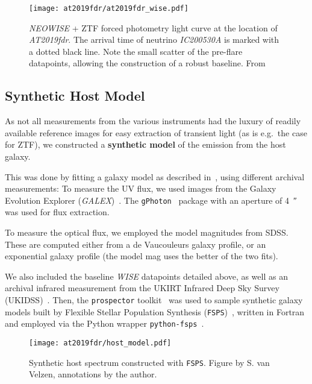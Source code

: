 \begin{figure}[htb]
    \texttt{[image: at2019fdr/at2019fdr\_wise.pdf]}
    \caption[\textit{NEOWISE} forced photometry]{\textit{NEOWISE} + ZTF forced photometry light curve at the location of \emph{AT2019fdr}. The arrival time of neutrino \emph{IC200530A} is marked with a dotted black line. Note the small scatter of the pre-flare datapoints, allowing the construction of a robust baseline. From~\cite{Velzen2021}}
\end{figure}

\subsection{Synthetic Host Model}\label{synthetic_host_model}
As not all measurements from the various instruments had the luxury of readily available reference images for easy extraction of transient light (as is e.g.\ the case for ZTF), we constructed a \textbf{synthetic model} of the emission from the host galaxy.

This was done by fitting a galaxy model as described in~, using different archival measurements: To measure the UV flux, we used images from the Galaxy Evolution Explorer (\textit{GALEX})~. The \texttt{gPhoton}~ package with an aperture of \SI{4}{\arcsecond} was used for flux extraction.

To measure the optical flux, we employed the model magnitudes from SDSS. These are computed either from a de Vaucouleurs galaxy profile, or an exponential galaxy profile (the model mag uses the better of the two fits).

We also included the baseline \textit{WISE} datapoints detailed above, as well as an archival infrared measurement from the UKIRT Infrared Deep Sky Survey (UKIDSS)~. Then, the \texttt{prospector} toolkit~ was used to sample synthetic galaxy models built by Flexible Stellar Population Synthesis (\texttt{FSPS})~, written in Fortran and employed via the Python wrapper \texttt{python-fsps}~.

\begin{figure}[htb]
    \texttt{[image: at2019fdr/host\_model.pdf]}
    \caption[Synthetic host spectrum]{Synthetic host spectrum constructed with \texttt{FSPS}. Figure by S. van Velzen, annotations by the author.}
\end{figure}

